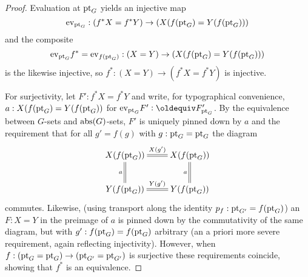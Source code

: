 \begin{proof}
  Evaluation at $\mathrm{pt}_G$  yields an injective map 
$$\mathrm{ev}_{\mathrm{pt}_G}:(f^*X=f^*Y)\to(X(f(\mathrm{pt}_G)=Y(f(\mathrm{pt}_G)))$$ and the composite 
$$\mathrm{ev}_{\mathrm{pt}_G}f^*=\mathrm{ev}_{f(\mathrm{pt}_G)}:(X=Y)\to(X(f(\mathrm{pt}_G)=Y(f(\mathrm{pt}_G)))$$
 is the likewise injective, so $f^*:(X=Y)\to(f^*X=f^*Y)$ is injective. 

For surjectivity, let $F':f^*X=f^*Y$ and write, for typographical convenience, $a:X(f(\mathrm{pt}_G)=Y(f(\mathrm{pt}_G))$ for $\mathrm{ev}_{\pt_G}F'\defequi F'_{\pt_G}$.  
By the equivalence between $G$-sets and $\mathrm{abs}(G)$-sets, $F'$ is uniquely pinned down by $a$ and the requirement that for all $g'=f(g)$ with $g:\mathrm{pt}_G=\mathrm{pt}_G$ the diagram 
$$\xymatrix{X(f(\pt_G))\ar@{=}[r]^{X({g'})}\ar@{=}[d]_{a}&
  X(f(\pt_G))\ar@{=}[d]_{a}\\
  Y(f(\pt_G))\ar@{=}[r]^{Y({g'})}&Y(f(\pt_G))}
$$
commutes.  Likewise, (using transport along the identity $p_f:\mathrm{pt}_{G'}=f(\mathrm{pt}_G)$) an $F:X=Y$ in the preimage of $a$ is pinned down by the commutativity of the same diagram, but with $g':f(\mathrm{pt}_G)=f(\mathrm{pt}_G)$ arbitrary (an a priori more severe requirement, again reflecting injectivity).   However, when $f:(\mathrm{pt}_G=\mathrm{pt}_G)\to(\mathrm{pt}_{G'}=\mathrm{pt}_{G'})$ is surjective these requirements coincide, showing that $f^*$ is an equivalence.





\end{proof}



